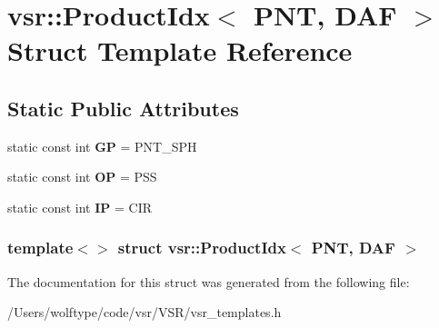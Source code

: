 \hypertarget{structvsr_1_1_product_idx_3_01_p_n_t_00_01_d_a_f_01_4}{\section{vsr\-:\-:Product\-Idx$<$ P\-N\-T, D\-A\-F $>$ Struct Template Reference}
\label{structvsr_1_1_product_idx_3_01_p_n_t_00_01_d_a_f_01_4}
}
\subsection*{Static Public Attributes}
\begin{DoxyCompactItemize}
\item 
\hypertarget{structvsr_1_1_product_idx_3_01_p_n_t_00_01_d_a_f_01_4_a144f73243ae037701ec3c0add2c94d19}{static const int {\bfseries G\-P} = P\-N\-T\-\_\-\-S\-P\-H}\label{structvsr_1_1_product_idx_3_01_p_n_t_00_01_d_a_f_01_4_a144f73243ae037701ec3c0add2c94d19}

\item 
\hypertarget{structvsr_1_1_product_idx_3_01_p_n_t_00_01_d_a_f_01_4_a4d7c295b7d604116aa6689dff59e08d7}{static const int {\bfseries O\-P} = P\-S\-S}\label{structvsr_1_1_product_idx_3_01_p_n_t_00_01_d_a_f_01_4_a4d7c295b7d604116aa6689dff59e08d7}

\item 
\hypertarget{structvsr_1_1_product_idx_3_01_p_n_t_00_01_d_a_f_01_4_a5aff4f8b2416a6aa47ab0b8454b1d666}{static const int {\bfseries I\-P} = C\-I\-R}\label{structvsr_1_1_product_idx_3_01_p_n_t_00_01_d_a_f_01_4_a5aff4f8b2416a6aa47ab0b8454b1d666}

\end{DoxyCompactItemize}
\subsubsection*{template$<$$>$ struct vsr\-::\-Product\-Idx$<$ P\-N\-T, D\-A\-F $>$}



The documentation for this struct was generated from the following file\-:\begin{DoxyCompactItemize}
\item 
/\-Users/wolftype/code/vsr/\-V\-S\-R/vsr\-\_\-templates.\-h\end{DoxyCompactItemize}
